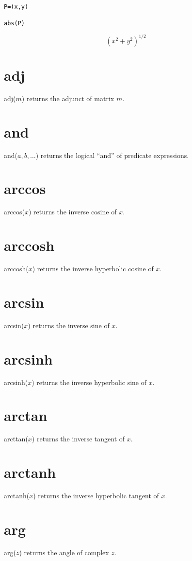 \documentclass[11pt]{article}
\begin{document}
\medskip
{\tt P=(x,y)}

{\tt abs(P)}

$$(x^2+y^2)^{1/2}$$

\section*{adj}
adj($m$) returns the adjunct of matrix $m$.

\section*{and}
and($a,b,\ldots$) returns the logical ``and'' of predicate expressions.

\section*{arccos}
arccos($x$) returns the inverse cosine of $x$.

\section*{arccosh}
arccosh($x$) returns the inverse hyperbolic cosine of $x$.

\section*{arcsin}
arcsin($x$) returns the inverse sine of $x$.

\section*{arcsinh}
arcsinh($x$) returns the inverse hyperbolic sine of $x$.

\section*{arctan}
arcttan($x$) returns the inverse tangent of $x$.

\section*{arctanh}
arctanh($x$) returns the inverse hyperbolic tangent of $x$.

\section*{arg}
arg($z$) returns the angle of complex $z$.
\end{document}
